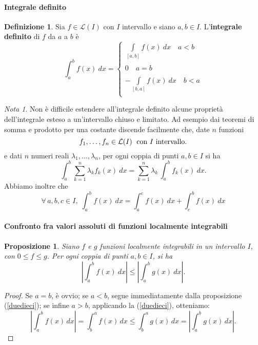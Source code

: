 \documentclass{article}
\theoremstyle{plain}
\newtheorem{prop}[thm]{Proposizione}
\theoremstyle{definition}
\newtheorem{defn}{Definizione}[section]
\theoremstyle{remark}
\newtheorem{note}{Nota}
\begin{document}
\vspace{10pt}

\paragraph{Integrale definito}
\begin{bxthm}
\begin{defn}
    Sia $f\in\mathcal{L}(I)$ con $I$ intervallo e siano $a,b\in I$. 
    L'\textbf{integrale definito} di $f$ da $a$ a $b$ è 
    \[\int_{a}^{b}f(x) \ dx=\begin{cases}
        \int\limits_{[a,b]} f(x) \ dx\quad a<b \\\\
        0\quad a=b\\\\
        -\int\limits_{[b,a]} f(x) \ dx\quad b<a\\
    \end{cases}\]
\end{defn}
\end{bxthm}

\vspace{10pt}

\begin{note}
    Non è difficile estendere all'integrale definito alcune proprietà dell'integrale esteso a un'intervallo chiuso e limitato. 
    Ad esempio dai teoremi di somma e prodotto per una costante discende facilmente che, date $n$ funzioni 
    \[f_1,\dots,f_n\in\mathcal{L}(I)\;\textup{ con }I\textup{ intervallo}.\]
    e dati $n$ numeri reali $\lambda_1,\dots,\lambda_n$, per ogni coppia di punti $a,b\in I$ si ha 
    \[\int_{a}^{b}\sum_{k=1}^{n}\lambda_k f_k(x) \ dx=\sum_{k=1}^{n}\lambda_k\,\int_{a}^{b} f_k(x) \ dx.\]
    Abbiamo inoltre che 
    \[\forall\,a,b,c\in I,\;\int_{a}^{b}f(x) \ dx = \int_{a}^{c}f(x) \ dx + \int_{c}^{b}f(x) \ dx\]
\end{note}

\vspace{10pt}

\paragraph{Confronto fra valori assoluti di funzioni localmente integrabili}
\begin{bxthm}
\begin{prop}
    Siano $f$ e $g$ funzioni localmente integrabili in un intervallo $I$, con $0\leq f\leq g$. 
    Per ogni coppia di punti $a,b\in I$, si ha 
    \[\left|\int_{a}^{b}f(x) \ dx\right|\leq\left|\int_{a}^{b}g(x) \ dx\right|.\]
\end{prop}
\end{bxthm}
\begin{proof}
    Se $a=b$, è ovvio; se $a<b$, segue immediatamente dalla proposizione (\ref{duedieci}); se infine $a>b$, applicando la (\ref{duedieci}), otteniamo:
    \[\left|\int_{a}^{b}f(x)\,dx\right|=\int_{b}^{a}f(x)\,dx\leq\int_{b}^{a}g(x)\,dx=\left|\int_{a}^{b}g(x)\,dx\right|.\]
\end{proof}
\end{document}
